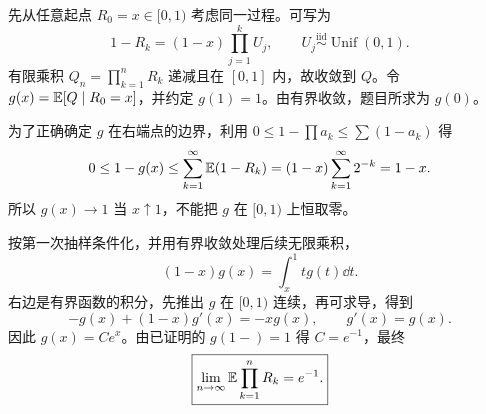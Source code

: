 先从任意起点 $R_0=x\in[0,1)$ 考虑同一过程。可写为
\[
1-R_k=(1-x)\prod_{j=1}^kU_j,
\qquad U_j\overset{\mathrm{iid}}\sim\operatorname{Unif}(0,1).
\]
有限乘积 $Q_n=\prod_{k=1}^nR_k$ 递减且在 $[0,1]$ 内，故收敛到 $Q$。令 $g(x)=\mathbb{E}[Q\mid R_0=x]$，并约定 $g(1)=1$。由有界收敛，题目所求为 $g(0)$。

为了正确确定 $g$ 在右端点的边界，利用 $0\le1-\prod a_k\le\sum(1-a_k)$ 得
\[
0\le1-g(x)\le\sum_{k=1}^{\infty}\mathbb{E}(1-R_k)
=(1-x)\sum_{k=1}^{\infty}2^{-k}=1-x.
\]
所以 $g(x)\to1$ 当 $x\uparrow1$，不能把 $g$ 在 $[0,1)$ 上恒取零。

按第一次抽样条件化，并用有界收敛处理后续无限乘积，
\[
(1-x)g(x)=\int_x^1t g(t)\dd t.
\]
右边是有界函数的积分，先推出 $g$ 在 $[0,1)$ 连续，再可求导，得到
\[
-g(x)+(1-x)g'(x)=-xg(x),\qquad g'(x)=g(x).
\]
因此 $g(x)=Ce^x$。由已证明的 $g(1-)=1$ 得 $C=e^{-1}$，最终
\[
\boxed{\lim_{n\to\infty}\mathbb{E}\prod_{k=1}^nR_k=e^{-1}.}
\]
